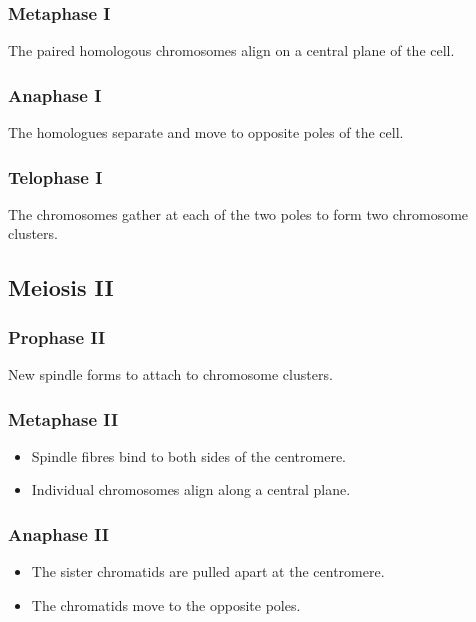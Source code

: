 \documentclass[11pt]{article}
\begin{document}
\subsubsection{Metaphase I}
\label{sec:org1ae14f4}
The paired homologous chromosomes align on a central plane of the cell.

\subsubsection{Anaphase I}
\label{sec:org0ad626d}
The homologues separate and move to opposite poles of the cell.

\subsubsection{Telophase I}
\label{sec:org29f0cd1}
The chromosomes gather at each of the two poles to form two chromosome clusters.

\subsection{Meiosis II}
\label{sec:orge18901e}

\subsubsection{Prophase II}
\label{sec:org1dc4208}
New spindle forms to attach to chromosome clusters.

\subsubsection{Metaphase II}
\label{sec:orgb0bae40}
\begin{itemize}
\item Spindle fibres bind to both sides of the centromere.
\item Individual chromosomes align along a central plane.
\end{itemize}

\subsubsection{Anaphase II}
\label{sec:org9e59b0b}
\begin{itemize}
\item The sister chromatids are pulled apart at the centromere.
\item The chromatids move to the opposite poles.
\end{itemize}
\end{document}
